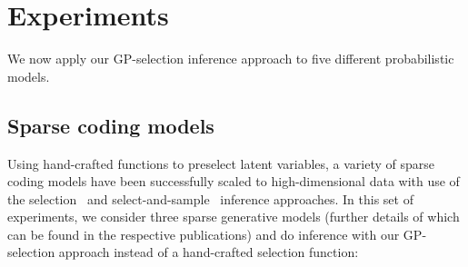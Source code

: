 \section{Experiments}
\label{exps}
%
We now apply our GP-selection inference approach to five different probabilistic models.

\subsection{Sparse coding models}
Using hand-crafted functions to preselect latent variables, a variety of sparse coding models have been successfully scaled to high-dimensional  data with use of the selection~\citep{HennigesEtAl2010, BornscheinEtAl2013, SheikhEtAl2014} and select-and-sample~\citep{SheltonEtAl2011, SheltonEtAl2012} inference approaches.
In this set of experiments, we consider three sparse generative models (further details of which can be found in the respective publications) and do inference with our GP-selection approach instead of a hand-crafted selection function:
%
